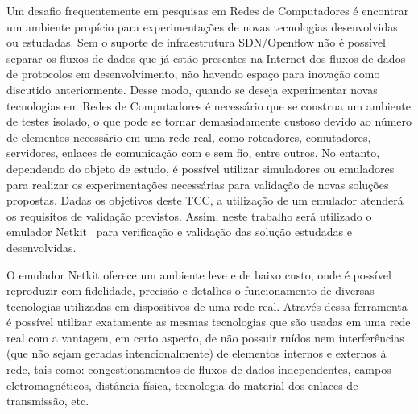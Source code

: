 \documentclass[	12pt, Times, openright, twoside, a4paper, english, brazil]{abntex2}
\begin{document}
Um desafio frequentemente em pesquisas em Redes de Computadores é encontrar um ambiente propício para experimentações de novas tecnologias desenvolvidas ou estudadas. Sem o suporte de infraestrutura SDN/Openflow não é possível separar os fluxos de dados que já estão presentes na Internet dos fluxos de dados de protocolos em desenvolvimento, não havendo espaço para inovação como  discutido anteriormente. Desse modo, quando se deseja experimentar novas tecnologias em Redes de Computadores é necessário que se construa um ambiente de testes isolado, o que pode se tornar demasiadamente custoso devido ao número de elementos necessário em uma rede real, como roteadores, comutadores, servidores, enlaces de comunicação com e sem fio, entre outros. No entanto, dependendo do objeto de estudo, é possível utilizar simuladores ou emuladores para realizar os experimentações necessárias para validação de novas soluções propostas. Dadas os objetivos deste TCC, a utilização de um emulador atenderá os requisitos de validação previstos. Assim, neste trabalho será utilizado o emulador Netkit~\cite{Pizzonia} para verificação e validação das solução estudadas e desenvolvidas.


O emulador Netkit oferece um ambiente leve e de baixo custo, onde é possível reproduzir com fidelidade, precisão e detalhes o funcionamento de diversas tecnologias utilizadas em dispositivos de uma rede real. Através dessa ferramenta é possível utilizar exatamente as mesmas tecnologias que são usadas em uma rede real com a vantagem, em certo aspecto, de não possuir ruídos nem interferências (que não sejam geradas intencionalmente) de elementos internos e externos à rede, tais como: congestionamentos de fluxos de dados independentes, campos eletromagnéticos, distância física, tecnologia do material dos enlaces de transmissão, etc.
\end{document}
